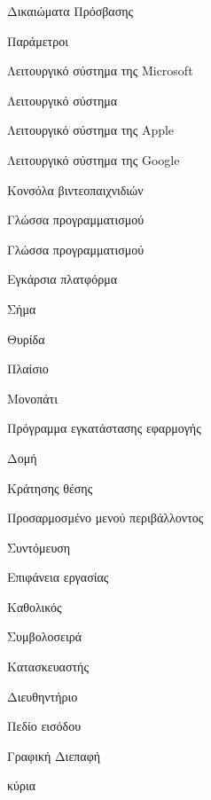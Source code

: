 
\gl
{}
{Δικαιώματα Πρόσβασης}



\gl
{}
{Παράμετροι}


\gl
{}
{Λειτουργικό σύστημα της Microsoft}



\gl
{}
{Λειτουργικό σύστημα}


\gl
{}
{Λειτουργικό σύστημα της Apple}


\gl
{}
{Λειτουργικό σύστημα της Google}


\gl
{}
{Κονσόλα βιντεοπαιχνιδιών}

\gl
{}
{Γλώσσα προγραμματισμού}

\gl
{}
{Γλώσσα προγραμματισμού}

\gl
{}
{Εγκάρσια πλατφόρμα}



\gl
{}
{Σήμα}


\gl
{}
{Θυρίδα}



\gl
{}
{Πλαίσιο}



\gl
{}
{Μονοπάτι}


\gl
{}
{Πρόγραμμα εγκατάστασης εφαρμογής}

\gl
{}
{}



\gl
{}
{Δομή}


\gl
{}
{Κράτησης θέσης}



\gl
{}
{Προσαρμοσμένο μενού περιβάλλοντος}


\gl
{}
{Συντόμευση}


\gl
{}
{Επιφάνεια εργασίας}



\gl
{}
{Καθολικός}


\gl
{}
{Συμβολοσειρά}



\gl
{}
{Kατασκευαστής}


\gl
{}
{Διευθηντήριο}


\gl
{}
{Πεδίο εισόδου}

\gl
{}
{Γραφική Διεπαφή}




\gl
{}
{κύρια}